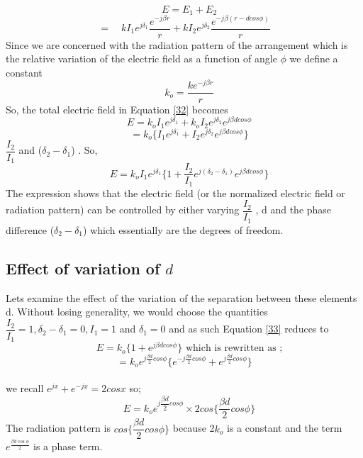 $$
\quad E = E_1 + E_2
$$           
\begin{equation}
\label{32}                   
=  \quad k I_{1} e^{j\delta_1}\dfrac{e^{-j\beta r}}{r} + k I_{2} e^{j\delta_2} \dfrac{e^{-j\beta(r-dcos\phi)}}{r} %
\end{equation}
Since we are concerned with the radiation pattern of the arrangement which is the relative variation of the electric field as a function of angle $\phi$ we define a constant   
$$
\quad k_o =\dfrac{ke^{-j\beta r}}{r}  %
$$
So, the total electric field in Equation \ref{32} becomes 
$$
\quad E = k_o I_1e^{j\delta_1} + k_o I_2e^{j\delta_2} e^{j\beta dcos\phi}
$$
$$
\quad = k_o \{I_1 e^{j\delta_1} + I_2 e^{j\delta_2} e^{j\beta dcos\phi}\}
$$
\quad $\dfrac{I_2}{I_1}$  {and}  ($\delta_2 - \delta_1$) . So, 
\begin{equation}
\label{33}
\quad E = k_o I_1 e^{j\delta_1} \{1 + \dfrac{I_2}{I_1} e^{j (\delta_2 - \delta_1)} e^{j\beta dcos\phi}\}
\end{equation} 
The expression shows that the electric field (or the normalized electric field or radiation pattern) can be controlled by either varying $\dfrac{I_2}{I_1}$ , d and the phase difference ($\delta_2 - \delta_1$) which essentially are the degrees of freedom.
\subsection{Effect of variation of $d$}
Lets examine the effect of the variation of the separation between these elements d. Without losing generality, we would choose the quantities $\dfrac{I_2}{I_1} = 1, \delta_2 - \delta_1 = 0 , I_1 =1 $ and $\delta_1 = 0 $ and as such Equation \ref{33} reduces to
$$
\quad E = k_o \{1 + e^{j\beta dcos\phi}\}  \text{ which is rewritten as ;} 
$$
$$
= k_o e^{j\frac{\beta d}{2} cos\phi} \{e^{-j\frac{\beta d}{2} cos\phi} + e^{j\frac{\beta d}{2} cos\phi}\} 
$$ \\ we recall $ e^{jx} + e^{-jx} = 2cosx $ so;
\begin{equation}
\quad E = k_o  e^{j\dfrac{\beta d}{2} cos\phi} \times 2 cos \{\dfrac{\beta d}{2} cos\phi\}   
\end{equation} %
The radiation pattern is $ cos\{\dfrac{\beta d}{2} cos\phi\} $ because 2$k_o $ is a constant and the term $e^{\frac{\beta d\cos\phi}{2}}$ is a phase term. \\

